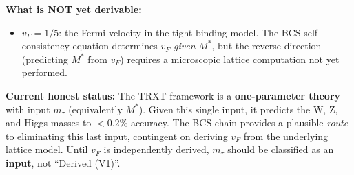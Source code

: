 \textbf{What is NOT yet derivable:}
\begin{itemize}
    \item $v_F = 1/5$: the Fermi velocity in the tight-binding model.  The BCS self-consistency equation determines $v_F$ \emph{given} $M^*$, but the reverse direction (predicting $M^*$ from $v_F$) requires a microscopic lattice computation not yet performed.
\end{itemize}

\textbf{Current honest status:} The TRXT framework is a \textbf{one-parameter theory} with input $m_\tau$ (equivalently $M^*$). Given this single input, it predicts the W, Z, and Higgs masses to $< 0.2\%$ accuracy.  The BCS chain provides a plausible \emph{route} to eliminating this last input, contingent on deriving $v_F$ from the underlying lattice model.  Until $v_F$ is independently derived, $m_\tau$ should be classified as an \textbf{input}, not ``Derived (V1)''.
